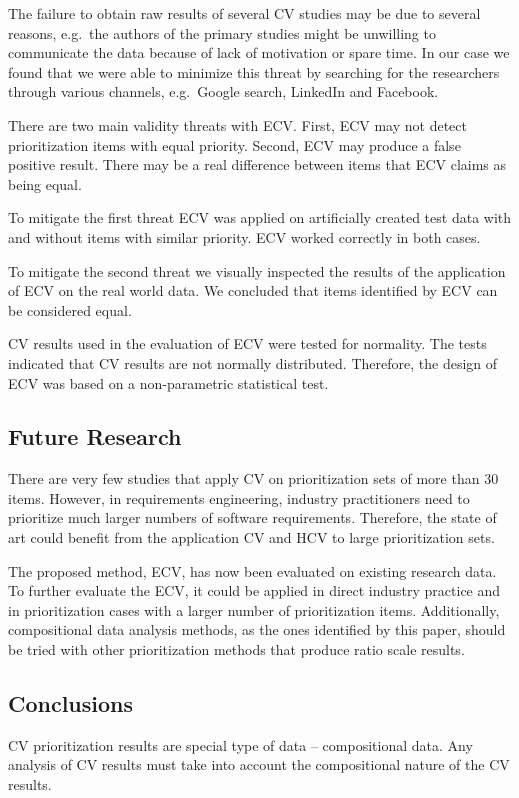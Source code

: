The failure to obtain raw results of several CV studies may be due to several reasons, e.g.\ the authors of the primary studies might be unwilling to communicate the data because of lack of motivation or spare time. In our case we found that we were able to minimize this threat by searching for the researchers through various channels, e.g.\ Google search, LinkedIn and Facebook.

There are two main validity threats with ECV.
First, ECV may not detect prioritization items with equal priority.
Second, ECV may produce a false positive result. There may be a real difference between items that ECV claims as being equal.

To mitigate the first threat ECV was applied on artificially created test data with and without items with similar priority.
ECV worked correctly in both cases.

To mitigate the second threat we visually inspected the results of the application of ECV on the real world data.
We concluded that items identified by ECV can be considered equal.

CV results used in the evaluation of ECV were tested for normality.
The tests indicated that CV results are not normally distributed.
Therefore, the design of ECV was based on a non-parametric statistical test.

\subsection{Future Research}
There are very few studies that apply CV on prioritization sets of more than 30 items.
However, in requirements engineering, industry practitioners need to prioritize much larger numbers of software requirements.
Therefore, the state of art could benefit from the application CV and HCV to large prioritization sets.

The proposed method, ECV, has now been evaluated on existing research data. To further evaluate the ECV, it could be applied in direct industry practice and in prioritization cases with a larger number of prioritization items.
Additionally, compositional data analysis methods, as the ones identified by this paper, should be tried with other prioritization methods that produce ratio scale results.

\subsection{Conclusions}
CV prioritization results are special type of data -- compositional data.
Any analysis of CV results must take into account the compositional nature of the CV results.

